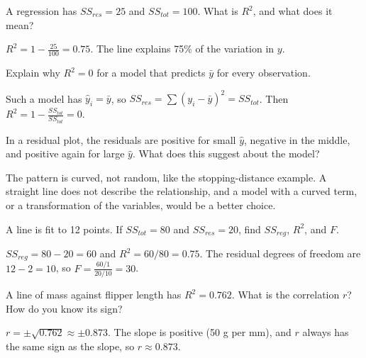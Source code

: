 \begin{Exercise}[label=lr2_1, title=Compute R-squared]
A regression has $SS_{res} = 25$ and $SS_{tot} = 100$. What is $R^2$, and what does it mean?
\end{Exercise}
\begin{Answer}[ref=lr2_1]
$R^2 = 1 - \frac{25}{100} = 0.75$. The line explains 75\% of the variation in $y$.
\end{Answer}

\begin{Exercise}[label=lr2_2, title=A model that predicts the mean]
Explain why $R^2 = 0$ for a model that predicts $\bar{y}$ for every observation.
\end{Exercise}
\begin{Answer}[ref=lr2_2]
Such a model has $\hat{y}_i = \bar{y}$, so $SS_{res} = \sum (y_i - \bar{y})^2 = SS_{tot}$.
Then $R^2 = 1 - \frac{SS_{tot}}{SS_{tot}} = 0$.
\end{Answer}

\begin{Exercise}[label=lr2_3, title=Read a residual plot]
In a residual plot, the residuals are positive for small $\hat{y}$, negative in the middle, and positive again
for large $\hat{y}$. What does this suggest about the model?
\end{Exercise}
\begin{Answer}[ref=lr2_3]
The pattern is curved, not random, like the stopping-distance example. A straight line does not describe the
relationship, and a model with a curved term, or a transformation of the variables, would be a better choice.
\end{Answer}

\begin{Exercise}[label=lr2_4, title=Fill in an ANOVA table, space=3cm]
A line is fit to 12 points. If $SS_{tot} = 80$ and $SS_{res} = 20$, find $SS_{reg}$, $R^2$, and $F$.
\end{Exercise}
\begin{Answer}[ref=lr2_4]
$SS_{reg} = 80 - 20 = 60$ and $R^2 = 60/80 = 0.75$. The residual degrees of freedom are $12 - 2 = 10$, so
$F = \frac{60/1}{20/10} = 30$.
\end{Answer}

\begin{Exercise}[label=lr2_5, title={Correlation from R-squared}]
A line of mass against flipper length has $R^2 = 0.762$. What is the correlation $r$? How do you know its
sign?
\end{Exercise}
\begin{Answer}[ref=lr2_5]
$r = \pm\sqrt{0.762} \approx \pm 0.873$. The slope is positive (50 g per mm), and $r$ always has the same sign
as the slope, so $r \approx 0.873$.
\end{Answer}

